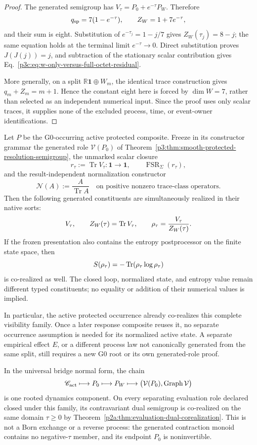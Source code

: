 \documentclass[12pt,a4paper]{article}
\begin{document}
\begin{proof}
The generated semigroup has
\(V_\tau=P_0+e^{-\tau}P_W\).  Therefore
\[
 q_{\rm sp}=7(1-e^{-\tau}),
 \qquad
 Z_W=1+7e^{-\tau},
\]
and their sum is eight.  Substitution of
\(e^{-\tau_j}=1-j/7\) gives \(Z_W(\tau_j)=8-j\); the same equation holds at
the terminal limit \(e^{-\tau}\to0\).  Direct substitution proves
\(J(J(j))=j\), and subtraction of the stationary scalar contribution gives
Eq.~\eqref{p3c:eq:w-only-versus-full-octet-residual}.

More generally, on a split \(\mathbb R\mathbf1\oplus W_m\), the identical
trace construction gives
\(q_m+Z_m=m+1\).  Hence the constant eight here is forced by
\(\dim W=7\), rather than selected as an independent numerical input.  Since
the proof uses only scalar traces, it supplies none of the excluded process,
time, or event-owner identifications.
\end{proof}

\begin{corollary}
\label{p3c:cor:corealized-protected-visibility-family}
Let \(P\) be the G0-occurring active protected composite.  Freeze in its
constructor grammar the generated role \(\mathcal V(P_0)\) of
Theorem~\ref{p3:thm:smooth-protected-resolution-semigroup}, the unmarked scalar
closure
\[
 r_\tau:=\operatorname{Tr}V_\tau:\mathbf1\to\mathbf1,
 \qquad \operatorname{FSR}_{\Sigma}(r_\tau),
\]
and the result-independent normalization constructor
\[
 \mathcal N(A):=\frac{A}{\operatorname{Tr}A}
 \quad\text{on positive nonzero trace-class operators.}
\]
Then the following generated constituents are simultaneously realized in
their native sorts:
\[
 V_\tau,\qquad
 Z_W(\tau)=\operatorname{Tr} V_\tau,\qquad
 \rho_\tau=\frac{V_\tau}{Z_W(\tau)}.
\]
If the frozen presentation also contains the entropy postprocessor on the
finite state space, then
\[
 S(\rho_\tau)=-\operatorname{Tr}(\rho_\tau\log\rho_\tau)
\]
is co-realized as well.  The closed loop, normalized state, and entropy value
remain different typed constituents; no equality or addition of their
numerical values is implied.

In particular, the active protected occurrence already co-realizes this
complete visibility family.  Once a later response composite reuses it, no
separate occurrence assumption is needed for its normalized active state.  A
separate empirical effect \(E\), or a different process law not canonically
generated from the same split, still requires a new G0 root or its own
generated-role proof.

In the universal bridge normal form, the chain
\[
 \mathscr C_{\rm act}\longmapsto P_0\longmapsto P_W
 \longmapsto
 \bigl(\mathcal V(P_0),\operatorname{Graph}\mathcal V\bigr)
\]
is one rooted dynamics component.  On every separating evaluation role
declared closed under this family, its contravariant dual semigroup is
co-realized on the same domain \(\tau\ge0\) by
Theorem~\ref{p2a:thm:evaluation-dual-corealization}.  This is not a Born
exchange or a reverse process: the generated contraction monoid contains no
negative-\(\tau\) member, and its endpoint \(P_0\) is noninvertible.
\end{corollary}
\end{document}
